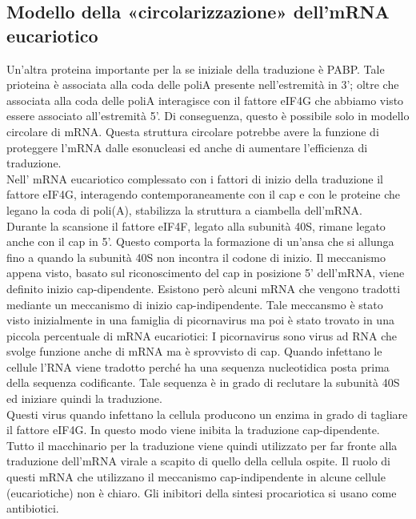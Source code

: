 \documentclass{article}
\begin{document}
\subsection{Modello della «circolarizzazione» dell'mRNA eucariotico}
Un'altra proteina importante per la se iniziale della traduzione è PABP.
Tale prioteina è associata alla coda delle poliA presente nell'estremità in 3'; oltre che associata alla coda delle poliA interagisce con il fattore
eIF4G che abbiamo visto essere associato all'estremità 5'. Di conseguenza, questo è possibile solo in modello circolare di mRNA. Questa
struttura circolare potrebbe avere la funzione di proteggere l'mRNA dalle
esonucleasi ed anche di aumentare l'efficienza di traduzione.\\
Nell' mRNA eucariotico complessato con i fattori di inizio della traduzione il fattore eIF4G, interagendo contemporaneamente con il cap e con le proteine che legano la coda di poli(A), stabilizza la struttura a ciambella dell'mRNA.\\
Durante la scansione il fattore eIF4F, legato alla subunità 40S, rimane legato anche con il cap in 5'. Questo comporta la formazione di un'ansa che si allunga fino a quando la subunità 40S non incontra il codone di inizio.
Il meccanismo appena visto, basato sul riconoscimento del cap in posizione 5' dell'mRNA, viene definito
inizio cap-dipendente. Esistono però alcuni mRNA che vengono tradotti mediante un meccanismo di
inizio cap-indipendente. Tale meccansmo è stato visto inizialmente in una famiglia di picornavirus ma poi è stato trovato in una
piccola percentuale di mRNA eucariotici: I picornavirus sono virus ad RNA che svolge funzione anche di mRNA ma è sprovvisto di cap. Quando infettano le
cellule l'RNA viene tradotto perché ha una sequenza nucleotidica posta prima della sequenza codificante. Tale
sequenza è in grado di reclutare la subunità 40S ed iniziare quindi la traduzione.\\
Questi virus quando infettano la cellula producono un enzima in grado di tagliare il
fattore eIF4G. In questo modo viene inibita la traduzione cap-dipendente. Tutto il
macchinario per la traduzione viene quindi utilizzato per far fronte alla traduzione
dell'mRNA virale a scapito di quello della cellula ospite. Il ruolo di questi mRNA che utilizzano il meccanismo cap-indipendente in alcune cellule
(eucariotiche) non è chiaro. Gli inibitori della sintesi procariotica si usano come antibiotici.
\end{document}
